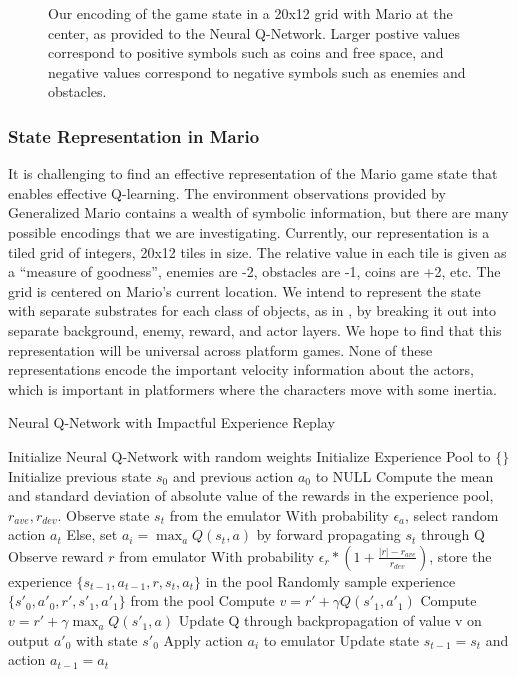 \documentclass{article}
\begin{document}
\begin{figure}
\begin{center}
\caption{Our encoding of the game state in a 20x12 grid with Mario at the center, as provided to the Neural Q-Network. Larger postive values correspond to positive symbols such as coins and free space, and negative values correspond to negative symbols such as enemies and obstacles.}
\end{center}
\end{figure}

\subsubsection{State Representation in Mario}
It is challenging to find an effective representation of the Mario game state that enables effective Q-learning. The environment observations provided by Generalized Mario contains a wealth of symbolic information, but there are many possible encodings that we are investigating. Currently, our representation is a tiled grid of integers, 20x12 tiles in size. The relative value in each tile is given as a ``measure of goodness'', enemies are -2, obstacles are -1, coins are +2, etc. The grid is centered on Mario's current location. We intend to represent the state with separate substrates for each class of objects, as in \cite{Hauskneck13}, by breaking it out into separate background, enemy, reward, and actor layers. We hope to find that this representation will be universal across platform games. None of these representations encode the important velocity information about the actors, which is important in platformers where the characters move with some inertia.

\begin{algorithm}[tb]
   \caption{Neural Q-Network with Impactful Experience Replay}
   \label{alg:q-learn}
\begin{algorithmic}
   \STATE Initialize Neural Q-Network with random weights
   \STATE Initialize Experience Pool to $\{ \}$
   \STATE Initialize previous state $s_0$ and previous action $a_0$ to NULL
   \STATE Compute the mean and standard deviation of absolute value of the rewards in the experience pool, $r_{ave}, r_{dev}$.
   \STATE Observe state $s_t$ from the emulator
   \STATE With probability $\epsilon_a$, select random action $a_t$
   \STATE Else, set $a_i = \max_a Q(s_t, a)$ by forward propagating $s_t$ through Q
   \STATE Observe reward $r$ from emulator
   \STATE With probability $\epsilon_r * (1 + \frac{|r| - r_{ave}}{r_{dev}})$, store the experience $\{s_{t-1}, a_{t-1}, r, s_t, a_t \}$ in the pool
   \ENDIF
   \STATE Randomly sample experience $\{s'_0, a'_0, r', s'_1, a'_1 \}$ from the pool
   \STATE Compute $v = r' + \gamma Q(s'_1, a'_1)$
   \ELSE
   \STATE Compute $v = r' + \gamma \max_a Q(s'_1, a)$
   \ENDIF
   \STATE Update Q through backpropagation of value v on output $a'_0$ with state $s'_0$
   \ENDFOR
   \STATE Apply action $a_i$ to emulator
   \STATE Update state $s_{t-1} = s_t$ and action $a_{t-1} = a_t$
   \ENDFOR
   \ENDFOR
\end{algorithmic}
\end{algorithm}
\end{document}
